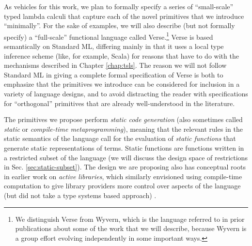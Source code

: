 As vehicles for this work, we plan to formally specify a series of ``small-scale'' typed lambda calculi that capture each of the novel primitives that we introduce ``minimally''. For the sake of examples, we will also describe (but not formally specify) a ``full-scale'' functional language called Verse.\footnote{We distinguish Verse from Wyvern, which is the language referred to in prior publications about some of the work that we will describe, because Wyvern is a group effort evolving independently in some important ways.} Verse is based semantically on Standard ML, differing mainly in that it uses a local type inference scheme \cite{Pierce:2000:LTI:345099.345100} (like, for example, Scala) for reasons that have to do with the mechanisms described in Chapter \ref{chap:tsls}. The reason we will not follow Standard ML \cite{mthm97-for-dart} in giving a complete formal specification of Verse is both to emphasize that the primitives we introduce can be considered for inclusion in a variety of language designs, and to avoid distracting the reader with specifications for ``orthogonal'' primitives that are already well-understood in the literature. %

The primitives we propose perform \emph{static code generation} (also sometimes called \emph{static} or \emph{compile-time metaprogramming}), meaning that the relevant rules in the static semantics of the language call for the evaluation of \emph{static functions} that generate static representations of terms. Static functions are functions written in a restricted subset of the language (we will discuss the design space of restrictions in Sec. \ref{sec:static-subset}). %
The design we are proposing also has conceptual roots in earlier work on \emph{active libraries}, which similarly envisioned using compile-time computation to give library providers more control over aspects of the language (but did not take a type systems based approach) \cite{active-libraries-thesis}. %


